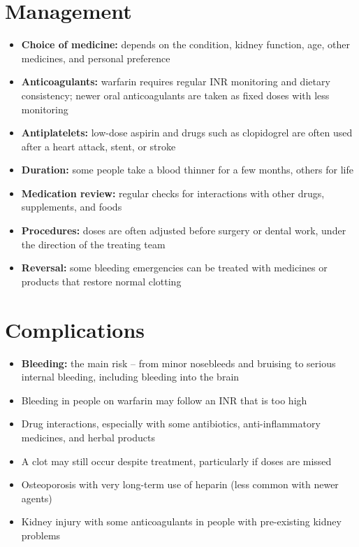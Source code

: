 \section*{Management}
\begin{itemize}
    \item \textbf{Choice of medicine:} depends on the condition, kidney function, age, other medicines, and personal preference
    \item \textbf{Anticoagulants:} warfarin requires regular INR monitoring and dietary consistency; newer oral anticoagulants are taken as fixed doses with less monitoring
    \item \textbf{Antiplatelets:} low-dose aspirin and drugs such as clopidogrel are often used after a heart attack, stent, or stroke
    \item \textbf{Duration:} some people take a blood thinner for a few months, others for life
    \item \textbf{Medication review:} regular checks for interactions with other drugs, supplements, and foods
    \item \textbf{Procedures:} doses are often adjusted before surgery or dental work, under the direction of the treating team
    \item \textbf{Reversal:} some bleeding emergencies can be treated with medicines or products that restore normal clotting
\end{itemize}

\section*{Complications}
\begin{itemize}
    \item \textbf{Bleeding:} the main risk -- from minor nosebleeds and bruising to serious internal bleeding, including bleeding into the brain
    \item Bleeding in people on warfarin may follow an INR that is too high
    \item Drug interactions, especially with some antibiotics, anti-inflammatory medicines, and herbal products
    \item A clot may still occur despite treatment, particularly if doses are missed
    \item Osteoporosis with very long-term use of heparin (less common with newer agents)
    \item Kidney injury with some anticoagulants in people with pre-existing kidney problems
\end{itemize}

